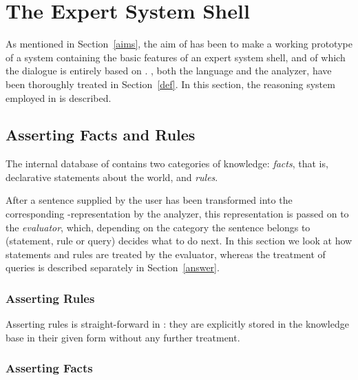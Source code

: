
\section{The Expert System Shell}
\label{shell}

As mentioned in Section~\ref{aims}, the aim of {\nash} has been to
make a working prototype of a system containing the basic features of
an expert system shell, and of which the dialogue is entirely based on
{\nal}. {\nal}, both the language and the analyzer, have been
thoroughly treated in Section~\ref{def}. In this section, the
reasoning system employed in {\nash} is described.

\subsection{Asserting Facts and Rules}
\label{assert}

The internal database of {\nash} contains two categories of knowledge:
{\em facts\/}, that is, declarative statements about the world, and
{\em rules\/}.

After a sentence supplied by the user has been transformed into the
corresponding {\niks}-representation by the analyzer, this
representation is passed on to the {\em evaluator\/}, which, depending
on the category the sentence belongs to (statement, rule or query)
decides what to do next. In this section we look at how statements and
rules are treated by the evaluator, whereas the treatment of queries
is described separately in Section~\ref{answer}.

\subsubsection{Asserting Rules}

Asserting rules is straight-forward in {\nash}: they are explicitly
stored in the knowledge base in their given form without any further
treatment.

\subsubsection{Asserting Facts}

